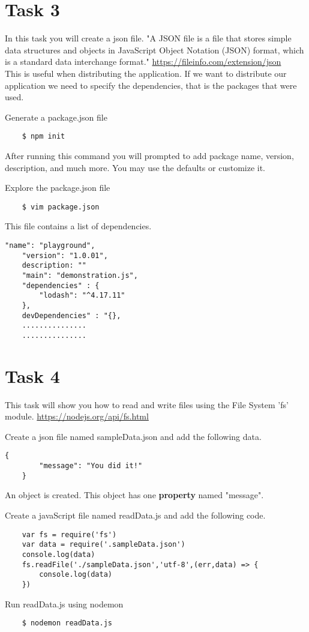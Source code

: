 \documentclass[12pt]{article}
\begin{document}
\section*{Task 3}
In this task you will create a json file. "A JSON file is a file that stores simple data structures and objects in JavaScript Object Notation (JSON) format, which is a standard data interchange format." \href{https://fileinfo.com/extension/json}{https://fileinfo.com/extension/json} \\
This is useful when distributing the application. If we want to distribute our application we need to specify the dependencies, that is the packages that were used. 
\begin{todolist}
    \item Generate a package.json file 
    \begin{lstlisting}
    $ npm init 
    \end{lstlisting}
    After running this command you will prompted to add package name, version, description, and much more. You may use the defaults or customize it. 
    \item Explore the package.json file 
    \begin{lstlisting}
    $ vim package.json 
    \end{lstlisting}
    This file contains a list of dependencies. 
    \begin{lstlisting}[title={package.json}]
    "name": "playground",
    "version": "1.0.01",
    description: ""
    "main": "demonstration.js",
    "dependencies" : {
        "lodash": "^4.17.11"
    },
    devDependencies" : "{},
    ...............
    ...............
    \end{lstlisting}
\end{todolist}
\section*{Task 4}
This task will show you how to read and write files using the File System 'fs' module. \href{https://nodejs.org/api/fs.html}{https://nodejs.org/api/fs.html}
\begin{todolist}
    \item Create a json file named sampleData.json and add the following data. 
    \begin{lstlisting}[title={sampleData.json}]
    {
        "message": "You did it!"
    }
    \end{lstlisting} 
    An object is created. This object has one \textbf{property} named "message". 
    \item Create a javaScript file named readData.js and add the following code. 
    \begin{lstlisting}
    var fs = require('fs')
    var data = require('.sampleData.json')
    console.log(data)
    fs.readFile('./sampleData.json','utf-8',(err,data) => {
        console.log(data)
    })
    \end{lstlisting}
    \item Run readData.js using nodemon 
    \begin{lstlisting}
    $ nodemon readData.js
    \end{lstlisting} 
\end{todolist}
\end{document}
